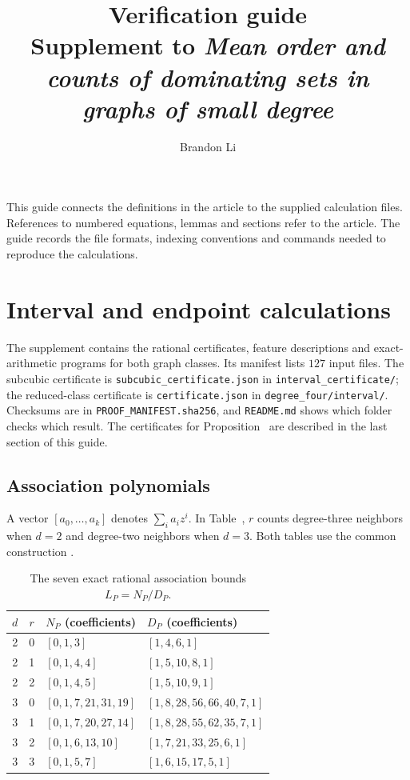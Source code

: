\documentclass[11pt]{article}
\title{Verification guide\\\large Supplement to \emph{Mean order and counts of dominating sets in graphs of small degree}}
\author{Brandon Li}\date{}
\newcommand{\file}[1]{\nolinkurl{#1}}
\begin{document}
\raggedbottom\maketitle
This guide connects the definitions in the article to the supplied calculation files. References to numbered equations, lemmas and sections refer to the article. The guide records the file formats, indexing conventions and commands needed to reproduce the calculations.

\section{Interval and endpoint calculations}

The supplement contains the rational certificates, feature descriptions and exact-arithmetic programs for both graph classes. Its manifest lists $127$ input files. The subcubic certificate is \file{subcubic_certificate.json} in \file{interval_certificate/}; the reduced-class certificate is \file{certificate.json} in \file{degree_four/interval/}. Checksums are in \file{PROOF_MANIFEST.sha256}, and \file{README.md} shows which folder checks which result. The certificates for Proposition~ are described in the last section of this guide.

\subsection{Association polynomials}
A vector $[a_0,\ldots,a_k]$ denotes $\sum_i a_i z^i$. In Table~, $r$ counts degree-three neighbors when $d=2$ and degree-two neighbors when $d=3$. Both tables use the common construction .

\begin{table}[ht]
\centering\small
\begin{tabular}{ccll}\toprule
$d$&$r$&$N_P$ (coefficients)&$D_P$ (coefficients)\\\midrule
2&0&$[0,1,3]$&$[1,4,6,1]$\\
2&1&$[0,1,4,4]$&$[1,5,10,8,1]$\\
2&2&$[0,1,4,5]$&$[1,5,10,9,1]$\\
3&0&$[0,1,7,21,31,19]$&$[1,8,28,56,66,40,7,1]$\\
3&1&$[0,1,7,20,27,14]$&$[1,8,28,55,62,35,7,1]$\\
3&2&$[0,1,6,13,10]$&$[1,7,21,33,25,6,1]$\\
3&3&$[0,1,5,7]$&$[1,6,15,17,5,1]$\\\bottomrule
\end{tabular}
\caption{The seven exact rational association bounds $L_P=N_P/D_P$.}\label{tab:patterns}
\end{table}
\end{document}
